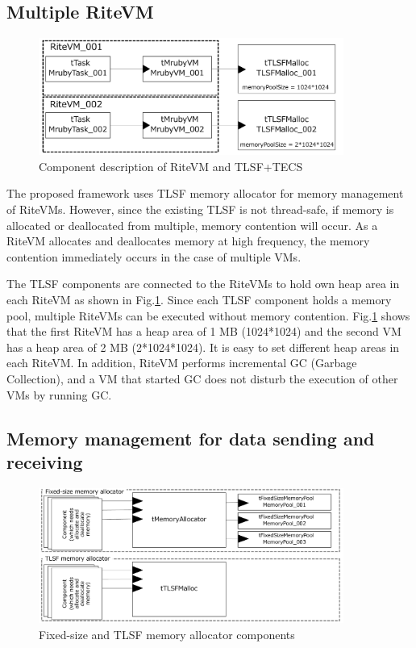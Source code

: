 \documentclass[a4j,12pt,oneside,openany,english]{jsbook}
\begin{document}
\subsection*{Multiple RiteVM}

\begin{figure}[t]
    \centering
    \includegraphics[width=10cm,clip]{figure/UseCase_mruby.pdf}
    \caption{Component description of RiteVM and TLSF+TECS}
    \label{fig:UseCase_mruby}
\end{figure}

The proposed framework uses TLSF memory allocator for memory management of RiteVMs.
However, since the existing TLSF is not thread-safe, if memory is allocated or deallocated from multiple, memory contention will occur.
As a RiteVM allocates and deallocates memory at high frequency, the memory contention immediately occurs in the case of multiple VMs.

The TLSF components are connected to the RiteVMs to hold own heap area in each RiteVM as shown in Fig.\ref{fig:UseCase_mruby}.
Since each TLSF component holds a memory pool, multiple RiteVMs can be executed without memory contention.
Fig.\ref{fig:UseCase_mruby} shows that the first RiteVM has a heap area of 1 MB (1024*1024) and the second VM has a heap area of 2 MB (2*1024*1024).
It is easy to set different heap areas in each RiteVM.
In addition, RiteVM performs incremental GC (Garbage Collection), and a VM that started GC does not disturb the execution of other VMs by running GC.
    
\subsection*{Memory management for data sending and receiving}

\begin{figure}[t]
    \centering
    \includegraphics[width=10cm,clip]{figure/UseCase_TINET.pdf}
    \caption{Fixed-size and TLSF memory allocator components}
    \label{fig:UseCase_TINET}
\end{figure}
\end{document}

